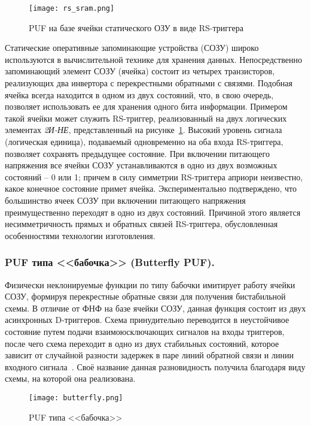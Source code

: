 \begin{figure}[ht]
    \centering
    \texttt{[image: rs\_sram.png]}
    \caption{PUF на базе ячейки статического ОЗУ в виде RS-триггера}
    \label{fig:domain:puf_types:sram}
\end{figure}

Статические оперативные запоминающие устройства (СОЗУ) широко используются в вычислительной технике для хранения данных. Непосредственно запоминающий элемент СОЗУ (ячейка) состоит из четырех транзисторов, реализующих два инвертора с перекрестными обратными с связями. Подобная ячейка всегда находится в одном из двух состояний, что, в свою очередь, позволяет использовать ее для хранения одного бита информации. Примером такой ячейки может служить RS-триггер, реализованный на двух логических элементах \emph{2И-НЕ}, представленный на рисунке~\ref{fig:domain:puf_types:sram}. Высокий уровень сигнала (логическая единица), подаваемый одновременно на оба входа RS-триггера, позволяет сохранять предыдущее состояние. При включении питающего напряжения все ячейки СОЗУ устанавливаются в одно из двух возможных состояний -- 0 или 1; причем в силу симметрии RS-триггера априори неизвестно, какое конечное состояние примет ячейка. Экспериментально подтверждено, что большинство ячеек СОЗУ при включении питающего напряжения преимущественно переходят в одно из двух состояний. Причиной этого является несимметричность прямых и обратных связей RS-триггера, обусловленная особенностями технологии изготовления.


\subsubsection{PUF типа <<бабочка>> (Butterfly PUF). }
\label{sub:domain:puf_types:butterfly}
Физически неклонируемые функции по типу бабочки имитирует работу ячейки СОЗУ, формируя перекрестные обратные связи для получения бистабильной схемы. В отличие от ФНФ на базе ячейки СОЗУ, данная функция состоит из двух асинхронных D-триггеров. Схема принудительно переводится в неустойчивое состояние путем подачи взаимоюсключающих сигналов на входы триггеров, после чего схема переходит в одно из двух стабильных состояний, которое зависит от случайной разности задержек в паре линий обратной связи и линии входного сигнала~\cite{yarmolik_vashinko}. Своё название данная разновидность получила благодаря виду схемы, на которой она реализована.
\begin{figure}[ht]
    \centering
    \label{fig:domain:puf_types:butterfly}
    \texttt{[image: butterfly.png]}
    \caption{PUF типа <<бабочка>>}
\end{figure}


